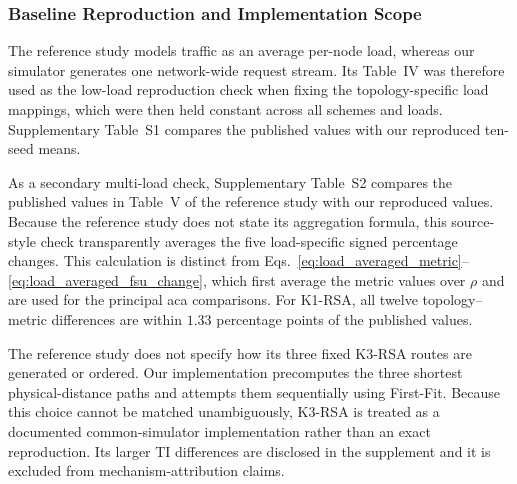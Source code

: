 \subsubsection{Baseline Reproduction and Implementation Scope}
\label{subsubsec:baseline_reproduction}

The reference study models traffic as an average per-node load, whereas
our simulator generates one network-wide request stream. Its Table~IV
was therefore used as the low-load reproduction check when fixing the
topology-specific load mappings, which were then held constant across
all schemes and loads. Supplementary Table~S1 compares the published
values with our reproduced ten-seed means.

As a secondary multi-load check, Supplementary Table~S2 compares the
published values in Table~V of the reference study with our reproduced
values. Because the reference study does not state its aggregation formula,
this source-style check transparently averages the five load-specific signed
percentage changes. This calculation is distinct from
Eqs.~\eqref{eq:load_averaged_metric}--%
\eqref{eq:load_averaged_fsu_change}, which first average the metric
values over \(\rho\) and are used for the principal \acs{aca}
comparisons. For K1-RSA, all twelve topology--metric differences are
within \(1.33\) percentage points of the published values.

The reference study does not specify how its three fixed K3-RSA routes
are generated or ordered. Our implementation precomputes the three
shortest physical-distance paths and attempts them sequentially using
First-Fit. Because this choice cannot be matched unambiguously, K3-RSA
is treated as a documented common-simulator implementation rather than
an exact reproduction. Its larger TI differences are disclosed in the
supplement and it is excluded from mechanism-attribution claims.

